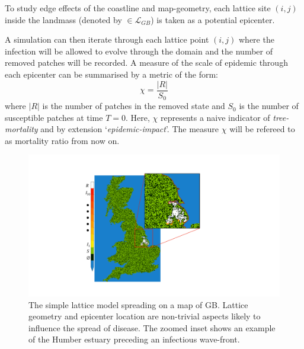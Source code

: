 To study  edge effects of the coastline and map-geometry, each lattice site $(i, j)$ inside %
the landmass (denoted by $\in \mathcal{L}_{GB}$) is taken as a potential epicenter. %

A simulation can then iterate through each lattice point $(i,j)$ where the infection will be %
allowed to evolve through the domain and the number of removed patches will be recorded. %
A measure of the scale of epidemic through each epicenter can be summarised by a metric of the form: %
\begin{equation}
\label{eq:epi_impact}
    \chi=\frac{|R|}{S_0}
\end{equation}
where $|R|$ is the number of patches in the removed state and $S_0$ is the number of susceptible %
patches at time $T=0$. Here, $\chi$ represents a naive indicator of \textit{tree-mortality} %
and by extension `\textit{epidemic-impact}'. The measure $\chi$ will be refereed to as mortality %
ratio from now on. %

\begin{figure}
    \centering
    \includegraphics[scale=0.3]{chapter4/figures/figure1.pdf}
    \caption{The simple lattice model spreading on a map of GB. Lattice geometry and epicenter %
    location are non-trivial aspects likely to influence the spread of disease. The zoomed inset %
    shows an example of the Humber estuary preceding an infectious wave-front. }
    \label{fig:uk-spread-primer}
\end{figure}

